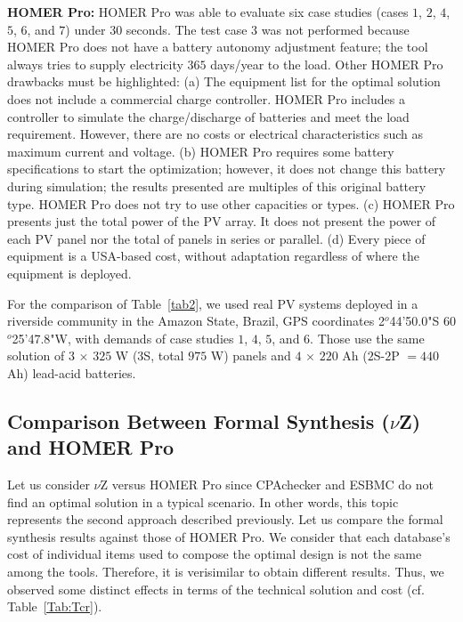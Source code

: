 \documentclass[a4paper,donotrepeattitle,fleqn]{cas-dc}
\begin{document}
\textbf{HOMER Pro:} HOMER Pro was able to evaluate six case studies (cases $1$, $2$, $4$, $5$, $6$, and $7$) under $30$ seconds. The test case $3$ was not performed because HOMER Pro does not have a battery autonomy adjustment feature; the tool always tries to supply electricity $365$ days/year to the load. Other HOMER Pro drawbacks must be highlighted: (a) The equipment list for the optimal solution does not include a commercial charge controller. HOMER Pro includes a controller to simulate the charge/discharge of batteries and meet the load requirement. However, there are no costs or electrical characteristics such as maximum current and voltage. (b) HOMER Pro requires some battery specifications to start the optimization; however, it does not change this battery during simulation; the results presented are multiples of this original battery type. HOMER Pro does not try to use other capacities or types. (c) HOMER Pro presents just the total power of the PV array. It does not present the power of each PV panel nor the total of panels in series or parallel. (d) Every piece of equipment is a USA-based cost, without adaptation regardless of where the equipment is deployed.

For the comparison of Table~\ref{tab2}, we used real PV systems deployed in a riverside community in the Amazon State, Brazil, GPS coordinates 2$^{o}$44'50.0"S 60$^{o}$25'47.8"W, with demands of case studies $1$, $4$, $5$, and $6$. Those use the same solution of $3$ $\times$ $325$ W ($3$S, total $975$ W) panels and $4$ $\times$ $220$ Ah ($2$S-$2$P $= 440$ Ah) lead-acid batteries.

\subsection{Comparison Between Formal Synthesis ($\nu$Z) and HOMER Pro}
  
Let us consider $\nu$Z versus HOMER Pro since CPAchecker and ESBMC do not find an optimal solution in a typical scenario. In other words, this topic represents the second approach described previously. Let us compare the formal synthesis results against those of HOMER Pro. We consider that each database's cost of individual items used to compose the optimal design is not the same among the tools. Therefore, it is verisimilar to obtain different results. Thus, we observed some distinct effects in terms of the technical solution and cost (cf. Table~\ref{Tab:Tcr}). 
\end{document}

